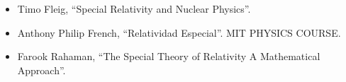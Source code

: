 \documentclass[../main]{subfiles}
\begin{document}
\begin{itemize}
    \item Timo Fleig, ``Special Relativity and Nuclear Physics''.
    \item Anthony Philip French, ``Relatividad Especial''. MIT PHYSICS COURSE.
    \item Farook Rahaman, ``The Special Theory of Relativity A Mathematical Approach''.
\end{itemize}
\end{document}
